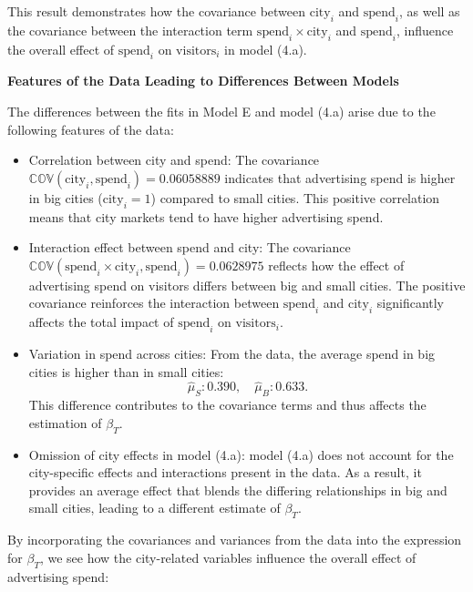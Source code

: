 \documentclass{article}
\begin{document}
This result demonstrates how the covariance between \(\text{city}_i\) and \(\text{spend}_i\), as well as the covariance between the interaction term \(\text{spend}_i \times \text{city}_i\) and \(\text{spend}_i\), influence the overall effect of \(\text{spend}_i\) on \(\text{visitors}_i\) in model (4.a).

\textbf{Features of the Data Leading to Differences Between Models}

The differences between the fits in Model E and model (4.a) arise due to the following features of the data:

\begin{itemize}
    \item Correlation between city and spend:
    The covariance \(\mathbb{COV}(\text{city}_i, \text{spend}_i) = 0.06058889\) indicates that advertising spend is higher in big cities (\(\text{city}_i = 1\)) compared to small cities. This positive correlation means that city markets tend to have higher advertising spend.

    \item Interaction effect between spend and city:
    The covariance \(\mathbb{COV}(\text{spend}_i \times \text{city}_i, \text{spend}_i) = 0.0628975\) reflects how the effect of advertising spend on visitors differs between big and small cities. The positive covariance reinforces the interaction between \(\text{spend}_i\) and \(\text{city}_i\) significantly affects the total impact of \(\text{spend}_i\) on \(\text{visitors}_i\).

    \item Variation in spend across cities:
    From the data, the average spend in big cities is higher than in small cities:
    \[
      \hat{\mu}_S: 0.390, \quad \hat{\mu}_B: 0.633.
    \]
    This difference contributes to the covariance terms and thus affects the estimation of \(\beta_T\).

    \item Omission of city effects in model (4.a):
    model (4.a) does not account for the city-specific effects and interactions present in the data. As a result, it provides an average effect that blends the differing relationships in big and small cities, leading to a different estimate of \(\beta_T\).
\end{itemize}

By incorporating the covariances and variances from the data into the expression for \(\beta_T\), we see how the city-related variables influence the overall effect of advertising spend:
\end{document}
